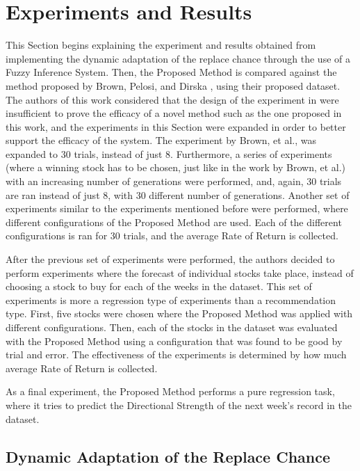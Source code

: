 \documentclass[12pt,journal,draftcls,onecolumn]{IEEEtran}
\begin{document}
\section{Experiments and Results}
\label{experiments-and-results}

This Section begins explaining the experiment and results obtained from implementing the dynamic adaptation of the replace chance through the use of a Fuzzy Inference System. Then, the Proposed Method is compared against the method proposed by Brown, Pelosi, and Dirska \cite{brown2013dynamic}, using their proposed dataset. The authors of this work considered that the design of the experiment in \cite{brown2013dynamic} were insufficient to prove the efficacy of a novel method such as the one proposed in this work, and the experiments in this Section were expanded in order to better support the efficacy of the system. The experiment by Brown, et al., was expanded to 30 trials, instead of just 8. Furthermore, a series of experiments (where a winning stock has to be chosen, just like in the work by Brown, et al.) with an increasing number of generations were performed, and, again, 30 trials are ran instead of just 8, with 30 different number of generations. Another set of experiments similar to the experiments mentioned before were performed, where different configurations of the Proposed Method are used. Each of the different configurations is ran for 30 trials, and the average Rate of Return is collected.

After the previous set of experiments were performed, the authors decided to perform experiments where the forecast of individual stocks take place, instead of choosing a stock to buy for each of the weeks in the dataset. This set of experiments is more a regression type of experiments than a recommendation type. First, five stocks were chosen where the Proposed Method was applied with different configurations. Then, each of the stocks in the dataset was evaluated with the Proposed Method using a configuration that was found to be good by trial and error. The effectiveness of the experiments is determined by how much average Rate of Return is collected.

As a final experiment, the Proposed Method performs a pure regression task, where it tries to predict the Directional Strength of the next week's record in the dataset.

\subsection{Dynamic Adaptation of the Replace Chance}
\end{document}
